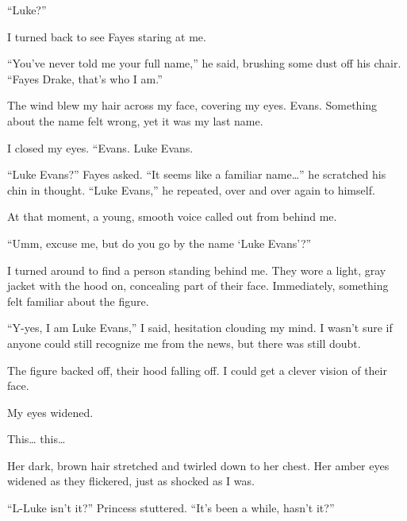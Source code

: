 “Luke?”

I turned back to see Fayes staring at me.

“You’ve never told me your full name,” he said, brushing some dust off his chair. “Fayes Drake, that’s who I am.”

The wind blew my hair across my face, covering my eyes. Evans. Something about the name felt wrong, yet it was my last name. 

I closed my eyes. “Evans. Luke Evans.

“Luke Evans?” Fayes asked. “It seems like a familiar name…” he scratched his chin in thought. “Luke Evans,” he repeated, over and over again to himself.

At that moment, a young, smooth voice called out from behind me.

“Umm, excuse me, but do you go by the name ‘Luke Evans’?”

I turned around to find a person standing behind me. They wore a light, gray jacket with the hood on, concealing part of their face. Immediately, something felt familiar about the figure.

“Y-yes, I am Luke Evans,” I said, hesitation clouding my mind. I wasn’t sure if anyone could still recognize me from the news, but there was still doubt.

The figure backed off, their hood falling off. I could get a clever vision of their face.

My eyes widened.

 This… this…

Her dark, brown hair stretched and twirled down to her chest. Her amber eyes widened as they flickered, just as shocked as I was.

“L-Luke isn’t it?” Princess stuttered. “It’s been a while, hasn’t it?”